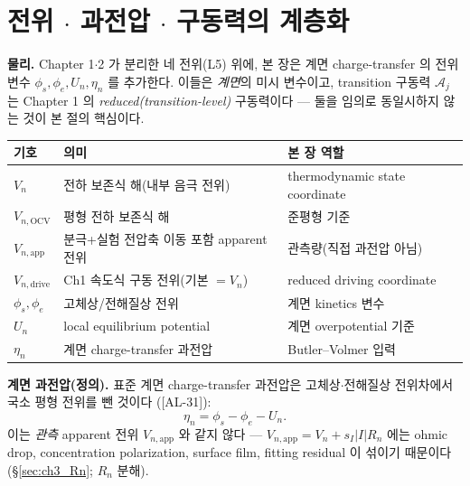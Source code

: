 \documentclass[11pt,a4paper]{article}
\newcommand{\app}{\mathrm{app}}
\newcommand{\drive}{\mathrm{drive}}
\newcommand{\OCV}{\mathrm{OCV}}
\newcommand{\AL}[1]{\textsf{[AL-#1]}}
\begin{document}
\section{전위 $\cdot$ 과전압 $\cdot$ 구동력의 계층화}\label{sec:ch3_potentials}
\textbf{물리.} Chapter 1$\cdot$2 가 분리한 네 전위(L5) 위에, 본 장은 계면 charge-transfer 의 전위 변수
$\phi_s,\phi_e,U_n,\eta_n$ 를 추가한다. 이들은 \emph{계면}의 미시 변수이고, transition 구동력 $\mathcal A_j$ 는
Chapter 1 의 \emph{reduced(transition-level)} 구동력이다 — 둘을 임의로 동일시하지 않는 것이 본 절의 핵심이다.
{\setlength{\tabcolsep}{4pt}
\begin{longtable}{p{} >{\raggedright\arraybackslash}p{} >{\raggedright\arraybackslash}p{}}
\toprule 기호 & 의미 & 본 장 역할 \\ \midrule \endhead
$V_n$ & 전하 보존식 해(내부 음극 전위) & thermodynamic state coordinate \\
$V_{n,\OCV}$ & 평형 전하 보존식 해 & 준평형 기준 \\
$V_{n,\app}$ & 분극+실험 전압축 이동 포함 apparent 전위 & 관측량(직접 과전압 아님) \\
$V_{n,\drive}$ & Ch1 속도식 구동 전위(기본 $=V_n$) & reduced driving coordinate \\
$\phi_s,\phi_e$ & 고체상/전해질상 전위 & 계면 kinetics 변수 \\
$U_n$ & local equilibrium potential & 계면 overpotential 기준 \\
$\eta_n$ & 계면 charge-transfer 과전압 & Butler--Volmer 입력 \\
\bottomrule
\end{longtable}}
\textbf{계면 과전압(정의).} 표준 계면 charge-transfer 과전압은 고체상$\cdot$전해질상 전위차에서 국소 평형
전위를 뺀 것이다 \cite{bardfaulkner,newman}(\AL{31}):
\begin{equation}
\eta_n=\phi_s-\phi_e-U_n.
\label{eq:ch3_eta_standard}
\end{equation}
이는 \emph{관측} apparent 전위 $V_{n,\app}$ 와 같지 않다 — $V_{n,\app}=V_n+s_I|I|R_n$ 에는 ohmic drop,
concentration polarization, surface film, fitting residual 이 섞이기 때문이다(\S\ref{sec:ch3_Rn}; $R_n$ 분해).
\end{document}
